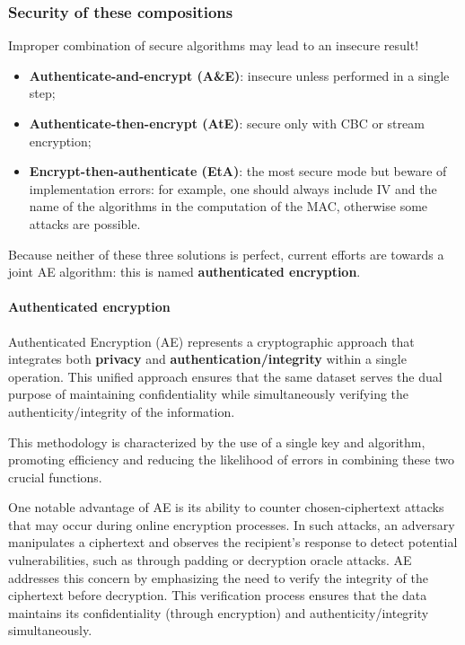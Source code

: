 \subsubsection{Security of these compositions}
Improper combination of secure algorithms may lead to an insecure result!
\begin{itemize}
    \item \textbf{Authenticate-and-encrypt (A\&E)}: insecure unless performed in a single step;
    \item \textbf{Authenticate-then-encrypt (AtE)}: secure only with CBC or stream encryption;
    \item \textbf{Encrypt-then-authenticate (EtA)}: the most secure mode but beware of implementation errors: for example, one should always include IV and the name of the algorithms in the computation of the MAC, otherwise some attacks are possible.
\end{itemize}
Because neither of these three solutions is perfect, current efforts are towards a joint AE algorithm: this is named \textbf{authenticated encryption}.


\paragraph*{Authenticated encryption}

Authenticated Encryption (AE) represents a cryptographic approach that integrates both \textbf{privacy} and \textbf{authentication/integrity} within a single operation.
This unified approach ensures that the same dataset serves the dual purpose of maintaining confidentiality while simultaneously verifying the authenticity/integrity of the information.

This methodology is characterized by the use of a single key and algorithm, promoting efficiency and reducing the likelihood of errors in combining these two crucial functions. 

One notable advantage of AE is its ability to counter chosen-ciphertext attacks that may occur during online encryption processes. In such attacks, an adversary manipulates a ciphertext and observes the recipient's response to detect potential vulnerabilities, such as through padding or decryption oracle attacks. AE addresses this concern by emphasizing the need to verify the integrity of the ciphertext before decryption. This verification process ensures that the data maintains its confidentiality (through encryption) and authenticity/integrity simultaneously.


